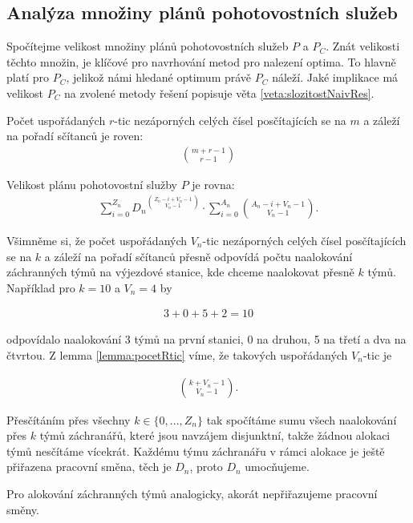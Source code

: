 \subsection{Analýza množiny plánů pohotovostních služeb}\label{kap:analP}

Spočítejme velikost množiny plánů pohotovostních služeb $P$ a $P_C$.
Znát velikosti těchto množin, je klíčové pro navrhování metod pro nalezení optima.
To hlavně platí pro $P_C$, jelikož námi hledané optimum právě $P_C$ náleží.
Jaké implikace má velikost $P_C$ na zvolené metody řešení popisuje věta \ref{veta:slozitostNaivRes}.

\begin{lemma}\label{lemma:pocetRtic}
  Počet uspořádaných $r$-tic nezáporných celých čísel posčítajících se na $m$ a záleží na pořadí sčítanců je roven: 
  \begin{align*}
    \binom{m + r - 1}{r - 1}
  \end{align*}
\end{lemma}

\begin{veta}\label{veta:velikostP}
  Velikost plánu pohotovostní služby $P$ je rovna:
  \begin{align*}
    \sum_{i = 0}^{Z_n} {D_n}^{\binom{Z_n - i + V_n - 1}{V_n - 1}} \cdot \sum_{i = 0}^{A_n} {\binom{A_n - i + V_n - 1}{V_n - 1}}.
  \end{align*}
\end{veta}

\begin{dukaz}
  Všimněme si, že počet uspořádaných $V_n$-tic nezáporných celých čísel posčítajících se na $k$
  a záleží na pořadí sčítanců přesně odpovídá počtu naalokování záchranných týmů na výjezdové stanice, kde chceme naalokovat přesně $k$ týmů.
  Například pro $k = 10$ a $V_n = 4$ by

  \begin{align*}
    3 + 0 + 5 + 2 = 10
  \end{align*}

  odpovídalo naalokování 3 týmů na první stanici, 0 na druhou, 5 na třetí a dva na čtvrtou.
  Z lemma \ref{lemma:pocetRtic} víme, že takových uspořádaných $V_n$-tic je

  \begin{align}
    \binom{k + V_n - 1}{V_n - 1}.
  \end{align}

  Přesčítáním přes všechny $k \in \{ 0, \dots, Z_n \}$ tak spočítáme sumu všech naalokování přes $k$ týmů záchranářů, které jsou navzájem disjunktní, takže žádnou alokaci týmů nesčítáme vícekrát.
  Každému týmu záchranářu v rámci alokace je ještě přiřazena pracovní směna, těch je $D_n$, proto $D_n$ umocňujeme. 

  Pro alokování záchranných týmů analogicky, akorát nepřiřazujeme pracovní směny.
\end{dukaz}

